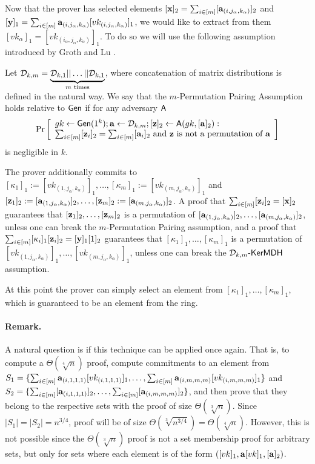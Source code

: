Now that the prover has selected elements $[\mathbf{x}]_2=\sum_{i\in[m]}[\mathbf{a}_{(i,j_\alpha,k_\alpha)}]_2$ and $[\mathbf{y}]_1=\sum_{i\in[m]}\mathbf{a}_{(i,j_\alpha,k_\alpha)}[vk_{(i,j_\alpha,k_\alpha)}]_1$, we would like to extract from them  $[vk_\alpha]_1=[vk_{(i_\alpha,j_\alpha,k_\alpha)}]_1$. To do so we will use the following assumption introduced by Groth and Lu \cite{AC:GroLu07}.

\begin{definition}
Let $\mathcal{D}_{k,m}=\underbrace{\mathcal{D}_{k,1}||\ldots||\mathcal{D}_{k,1}}_{m\text{ times}}$, where concatenation of matrix distributions is defined in the natural way. We say that the $m$-Permutation Pairing Assumption holds relative to $\mathsf{Gen}$ if for any adversary $\mathsf{A}$
$$
\Pr\left[
\begin{array}{l}
gk\gets\mathsf{Gen}(1^k);\mathbf{a}\gets\mathcal{D}_{k,m};[\mathbf{z}]_2\gets\mathsf{A}(gk,[\mathbf{a}]_2):\\
\sum_{i\in[m]}[\mathbf{z}_i]_2=\sum_{i\in[m]}[\mathbf{a}_i]_2\text{ and }
\mathbf{z}\text{ is not a permutation of }\mathbf{a}
\end{array}
\right]
$$
is negligible in $k$.
\end{definition}

The prover additionally commits to $[\kappa_1]_1:=[vk_{(1,j_\alpha,k_\alpha)}]_1,\ldots,[\kappa_m]_1:=[vk_{(m,j_\alpha,k_\alpha)}]_1$ and $[\mathbf{z}_1]_2:=[\mathbf{a}_{(1,j_\alpha,k_\alpha)}]_2,\ldots,[\mathbf{z}_m]_2:=[\mathbf{a}_{(m,j_\alpha,k_\alpha)}]_2$. A proof that $\sum_{i\in[m]}[\mathbf{z}_i]_2=[\mathbf{x}]_2$ guarantees that $[\mathbf{z}_1]_2,\ldots,[\mathbf{z}_m]_2$ is a permutation of $[\mathbf{a}_{(1,j_\alpha,k_\alpha)}]_2,\ldots,[\mathbf{a}_{(m,j_\alpha,k_\alpha)}]_2$, unless one can break the $m$-Permutation Pairing assumption, and a proof that $\sum_{i\in[m]}[\kappa_i]_1[\mathbf{z}_i]_2=[\mathbf{y}]_1[1]_2$ guarantees that $[\kappa_1]_1,\ldots,[\kappa_m]_1$ is a permutation of $[vk_{(1,j_\alpha,k_\alpha)}]_1,\ldots,[vk_{(m,j_\alpha,k_\alpha)}]_1$, unless one can break the $\mathcal{D}_{k,m}\mbox{-}\mathsf{KerMDH}$ assumption.

At this point the prover can simply select an element from $[\kappa_1]_1,\ldots,[\kappa_m]_1$, which is guaranteed to be an element from the ring.

\paragraph{Remark.}
A natural question is if this technique can be applied once again. That is, to compute a $\Theta(\sqrt[4]{n})$  proof, compute commitments to an element from $S_1=\{\sum_{i\in[m]}\mathbf{a}_{(i,1,1,1)}[vk_{(i,1,1,1)}]_1,\ldots,\sum_{i\in[m]}\mathbf{a}_{(i,m,m,m)}[vk_{(i,m,m,m)}]_1\}$ and $S_2=\allowbreak\{\sum_{i\in[m]}[\mathbf{a}_{(i,1,1,1)}]_2,\ldots,\sum_{i\in[m]}[\mathbf{a}_{(i,m,m,m)}]_2\}$, and then prove that they belong to the respective sets with the proof of size $\Theta(\sqrt[3]{n})$. Since $|S_1|=|S_2|=n^{3/4}$, proof will be of size $\Theta(\sqrt[3]{n^{3/4}})=\Theta(\sqrt[4]{n})$. However, this is not possible since the $\Theta(\sqrt[3]{n})$ proof is not a set membership proof for arbitrary sets, but only for sets where each element is of the form $([vk]_1,\mathbf{a}[vk]_1,[\mathbf{a}]_2)$.

